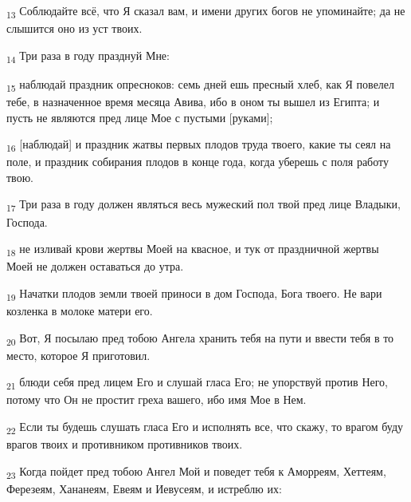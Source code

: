 \begin{tcolorbox}
\textsubscript{13} Соблюдайте всё, что Я сказал вам, и имени других богов не упоминайте; да не слышится оно из уст твоих.
\end{tcolorbox}
\begin{tcolorbox}
\textsubscript{14} Три раза в году празднуй Мне:
\end{tcolorbox}
\begin{tcolorbox}
\textsubscript{15} наблюдай праздник опресноков: семь дней ешь пресный хлеб, как Я повелел тебе, в назначенное время месяца Авива, ибо в оном ты вышел из Египта; и пусть не являются пред лице Мое с пустыми [руками];
\end{tcolorbox}
\begin{tcolorbox}
\textsubscript{16} [наблюдай] и праздник жатвы первых плодов труда твоего, какие ты сеял на поле, и праздник собирания плодов в конце года, когда уберешь с поля работу твою.
\end{tcolorbox}
\begin{tcolorbox}
\textsubscript{17} Три раза в году должен являться весь мужеский пол твой пред лице Владыки, Господа.
\end{tcolorbox}
\begin{tcolorbox}
\textsubscript{18} не изливай крови жертвы Моей на квасное, и тук от праздничной жертвы Моей не должен оставаться до утра.
\end{tcolorbox}
\begin{tcolorbox}
\textsubscript{19} Начатки плодов земли твоей приноси в дом Господа, Бога твоего. Не вари козленка в молоке матери его.
\end{tcolorbox}
\begin{tcolorbox}
\textsubscript{20} Вот, Я посылаю пред тобою Ангела хранить тебя на пути и ввести тебя в то место, которое Я приготовил.
\end{tcolorbox}
\begin{tcolorbox}
\textsubscript{21} блюди себя пред лицем Его и слушай гласа Его; не упорствуй против Него, потому что Он не простит греха вашего, ибо имя Мое в Нем.
\end{tcolorbox}
\begin{tcolorbox}
\textsubscript{22} Если ты будешь слушать гласа Его и исполнять все, что скажу, то врагом буду врагов твоих и противником противников твоих.
\end{tcolorbox}
\begin{tcolorbox}
\textsubscript{23} Когда пойдет пред тобою Ангел Мой и поведет тебя к Аморреям, Хеттеям, Ферезеям, Хананеям, Евеям и Иевусеям, и истреблю их:
\end{tcolorbox}

